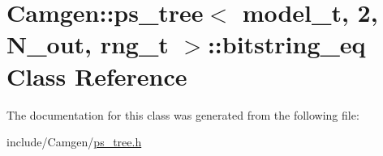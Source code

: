 \hypertarget{a00031}{\section{Camgen\-:\-:ps\-\_\-tree$<$ model\-\_\-t, 2, N\-\_\-out, rng\-\_\-t $>$\-:\-:bitstring\-\_\-eq Class Reference}
\label{a00031}
}


The documentation for this class was generated from the following file\-:\begin{DoxyCompactItemize}
\item 
include/\-Camgen/\hyperlink{a00718}{ps\-\_\-tree.\-h}\end{DoxyCompactItemize}
